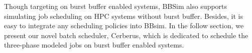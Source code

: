 % 




Though targeting on burst buffer enabled systems, 
BBSim also supports simulating job scheduling on HPC systems without burst buffer.
Besides, it is easy to integrate any scheduling policies into BBsim. 
In the follow section, we present our novel batch scheduler, 
Cerberus, which is dedicated to schedule the three-phase modeled jobs on burst buffer enabled systems. 


